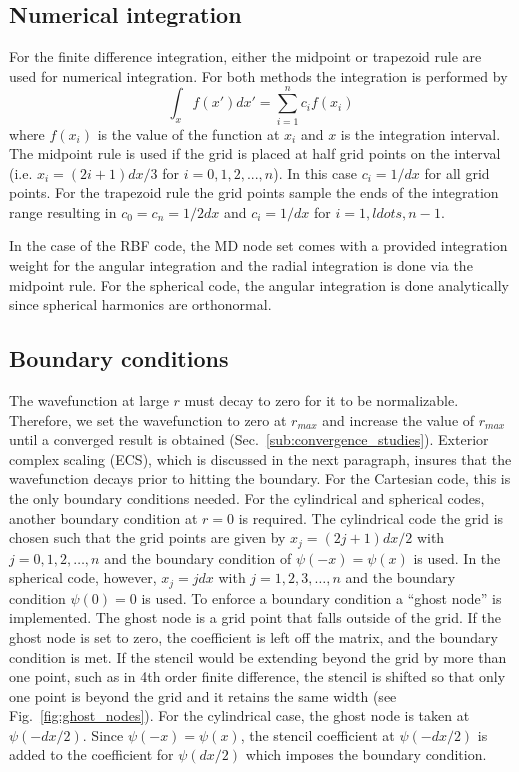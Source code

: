 
\subsection{Numerical integration} %
\label{sub:numerical_integration}
For the finite difference integration, either the midpoint or trapezoid rule are used for numerical integration. For both methods the integration is performed by 
\begin{equation}
    \int_{x} f(x')dx' = \sum_{i=1}^n c_i f(x_i)
\end{equation}
where $f(x_i)$ is the value of the function at $x_i$ and $x$ is the integration interval. The midpoint rule is used if the grid is placed at half grid points on the interval (i.e. $x_i = (2i+1)dx/3$ for $i=0,1,2,...,n$). In this case $c_i = 1/dx$ for all grid points. For the trapezoid rule the grid points sample the ends of the integration range resulting in $c_0 = c_n = 1/2dx$ and $c_i = 1/dx$ for $i=1, ldots, n-1$. 

In the case of the RBF code, the MD node set comes with a provided integration weight for the angular integration and the radial integration is done via the midpoint rule. 
For the spherical code, the angular integration is done analytically since spherical harmonics are orthonormal.

\subsection{Boundary conditions} %
\label{sub:boundary_conditions}
The wavefunction at large $r$ must decay to zero for it to be normalizable. Therefore, we set the wavefunction to zero at $r_{max}$ and increase the value of $r_{max}$ until a converged result is obtained (Sec.~\ref{sub:convergence_studies}). Exterior complex scaling (ECS), which is discussed in the next paragraph, insures that the wavefunction decays prior to hitting the boundary. For the Cartesian code, this is the only boundary conditions needed. For the cylindrical and spherical codes, another boundary condition at $r=0$ is required. The cylindrical code the grid is chosen such that the grid points are given by $x_j = (2j+1)dx/2$ with $j=0, 1, 2, \ldots, n$ and the boundary condition of $\psi(-x)=\psi(x)$ is used. In the spherical code, however, $x_j = jdx$ with $j=1,2,3, \ldots, n$ and the boundary condition $\psi(0)=0$ is used. To enforce a boundary condition a ``ghost node'' is implemented. The ghost node is a grid point that falls outside of the grid. If the ghost node is set to zero, the coefficient is left off the matrix, and the boundary condition is met. If the stencil would be extending beyond the grid by more than one point, such as in 4th order finite difference, the stencil is shifted so that only one point is beyond the grid and it retains the same width (see Fig.~\ref{fig:ghost_nodes}). For the cylindrical case, the ghost node is taken at $\psi(-dx/2)$. Since $\psi(-x)=\psi(x)$, the stencil coefficient at $\psi(-dx/2)$ is added to the coefficient for $\psi(dx/2)$ which imposes the boundary condition.


